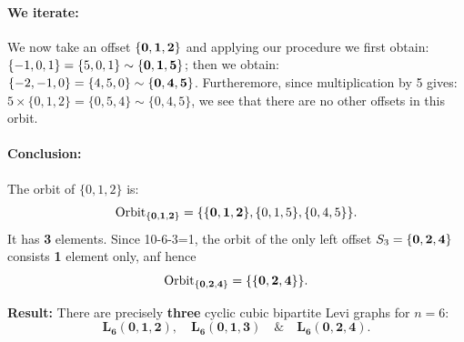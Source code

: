 \documentclass[12pt,letterpaper]{amsart}
\begin{document}
\paragraph{We iterate:}
We now take an offset ${\bf \{0,1,2\}}$ and applying our procedure we first obtain: $\{-1,0,1\}=\{5,0,1\}\sim {\bf\{0,1,5\}}$; then we obtain: $\{-2,-1,0\}=\{4,5,0\}\sim{\bf\{0,4,5\}}$. Furtheremore, since multiplication by 5 gives: $5\times\{0,1,2\}=\{0,5,4\}\sim\{0,4,5\}$, we see that there are no other offsets in this orbit. 
\paragraph{Conclusion:} 
The orbit of $\{0,1,2\}$ is:
\[ \text{Orbit}_{{\bf \{0,1,2\}}} = \{ {\bf \{0,1,2\}}, \{0,1,5\}, \{0,4,5\} \}.\]
It has \textbf{3} elements. Since 10-6-3=1, the orbit of the only left offset $S_3={\bf \{0,2,4\}}$ consists \textbf{1} element only, anf hence 
\[ \text{Orbit}_{{\bf \{0,2,4\}}} = \{{\bf  \{0,2,4\}} \}. \]

\textbf{Result:} There are precisely \textbf{three} cyclic cubic bipartite Levi graphs for $n=6$: $$\mathbf{L_6(0,1,2)}, \quad \mathbf{L_6(0,1,3)}\quad \&\quad  \mathbf{L_6(0,2,4)}.$$
\end{document}

